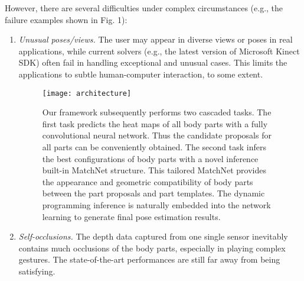 \documentclass{sig-alternate-05-2015}
\begin{document}
However, there are several difficulties under complex circumstances (e.g., the failure examples shown in Fig. 1):
\begin{enumerate}
 
\item \emph{Unusual poses/views.} The user may appear in diverse views or poses in real applications, while current solvers (e.g., the latest version of Microsoft Kinect SDK) often fail in handling exceptional and unusual cases. This limits the applications to subtle human-computer interaction, to some extent. 

\begin{figure}[!htb]
\centering
\texttt{[image: architecture]}
\caption{Our framework subsequently performs two cascaded tasks. The first task predicts the heat maps of all body parts with a fully convolutional neural network. Thus the candidate proposals for all parts can be conveniently obtained. The second task infers the best configurations of body parts with a novel inference built-in MatchNet structure. This tailored MatchNet provides the appearance and geometric compatibility of body parts between the part proposals and part templates. The dynamic programming inference is naturally embedded into the network learning to generate final pose estimation results.}\label{fig:framework}
\end{figure} 

\item \emph{Self-occlusions.} The depth data captured from one single sensor inevitably contains much occlusions of the body parts, especially in playing complex gestures. The state-of-the-art performances are still far away from being satisfying. 
\end{enumerate}
\end{document}
